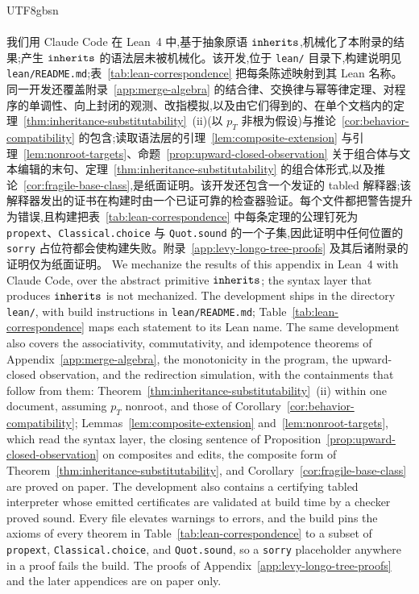 \begin{CJK*}{UTF8}{gbsn}
\paragraph{}
\ifPaperChinese
我们用 Claude Code 在 Lean~4 中,基于抽象原语 $\mathtt{inherits}$,机械化了本附录的结果;产生 $\mathtt{inherits}$ 的语法层未被机械化。该开发,位于 \texttt{lean/} 目录下,构建说明见 \texttt{lean/README.md};表~\ref{tab:lean-correspondence} 把每条陈述映射到其 Lean 名称。同一开发还覆盖附录~\ref{app:merge-algebra} 的结合律、交换律与幂等律定理、对程序的单调性、向上封闭的观测、改指模拟,以及由它们得到的、在单个文档内的定理~\ref{thm:inheritance-substitutability}~(ii)(以 $p_T$ 非根为假设)与推论~\ref{cor:behavior-compatibility} 的包含;读取语法层的引理~\ref{lem:composite-extension} 与引理~\ref{lem:nonroot-targets}、命题~\ref{prop:upward-closed-observation} 关于组合体与文本编辑的末句、定理~\ref{thm:inheritance-substitutability} 的组合体形式,以及推论~\ref{cor:fragile-base-class},是纸面证明。该开发还包含一个发证的 tabled 解释器;该解释器发出的证书在构建时由一个已证可靠的检查器验证。每个文件都把警告提升为错误,且构建把表~\ref{tab:lean-correspondence} 中每条定理的公理钉死为 \texttt{propext}、\texttt{Classical.choice} 与 \texttt{Quot.sound} 的一个子集,因此证明中任何位置的 \texttt{sorry} 占位符都会使构建失败。附录~\ref{app:levy-longo-tree-proofs} 及其后诸附录的证明仅为纸面证明。
\else
We mechanize the results of this appendix in Lean~4 with Claude Code, over the abstract primitive $\mathtt{inherits}$; the syntax layer that produces $\mathtt{inherits}$ is not mechanized. The development ships in the directory \texttt{lean/}, with build instructions in \texttt{lean/README.md}; Table~\ref{tab:lean-correspondence} maps each statement to its Lean name. The same development also covers the associativity, commutativity, and idempotence theorems of Appendix~\ref{app:merge-algebra}, the monotonicity in the program, the upward-closed observation, and the redirection simulation, with the containments that follow from them: Theorem~\ref{thm:inheritance-substitutability}~(ii) within one document, assuming $p_T$ nonroot, and those of Corollary~\ref{cor:behavior-compatibility}; Lemmas~\ref{lem:composite-extension} and~\ref{lem:nonroot-targets}, which read the syntax layer, the closing sentence of Proposition~\ref{prop:upward-closed-observation} on composites and edits, the composite form of Theorem~\ref{thm:inheritance-substitutability}, and Corollary~\ref{cor:fragile-base-class} are proved on paper. The development also contains a certifying tabled interpreter whose emitted certificates are validated at build time by a checker proved sound. Every file elevates warnings to errors, and the build pins the axioms of every theorem in Table~\ref{tab:lean-correspondence} to a subset of \texttt{propext}, \texttt{Classical.choice}, and \texttt{Quot.sound}, so a \texttt{sorry} placeholder anywhere in a proof fails the build. The proofs of Appendix~\ref{app:levy-longo-tree-proofs} and the later appendices are on paper only.
\fi


\end{CJK*}
